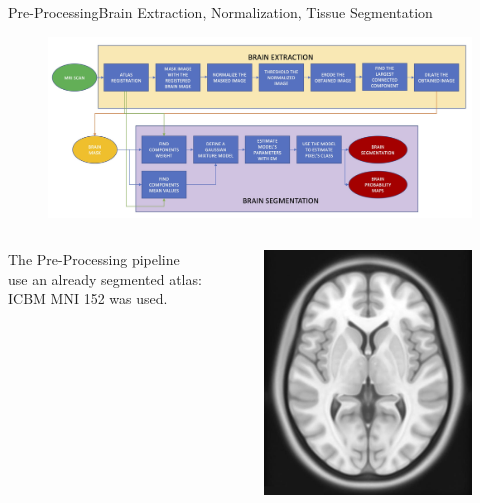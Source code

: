\documentclass[]{standalone}
\begin{document}
	\begin{frame}{Pre-Processing}{Brain Extraction, Normalization, Tissue Segmentation}
		\vspace{-39pt}
		\begin{figure}[h!]
					\includegraphics[scale = 0.1, width=\textwidth]{./IMG/FLOWCHART_PRE.jpg}
				\end{figure}
				
		\vspace{-12pt}
		\begin{columns}
			\begin{column}{0.5\textwidth}
			\small
				The Pre-Processing pipeline use an already segmented atlas: ICBM MNI 152 was used.
				
			\end{column}
			\begin{column}{0.5\textwidth}
				\begin{figure}[h!]
				\centering
					\includegraphics[scale = 0.07]{./IMG/atlas.jpg}
				\end{figure}
				
			\end{column}
		\end{columns}
	\end{frame}
\end{document}
